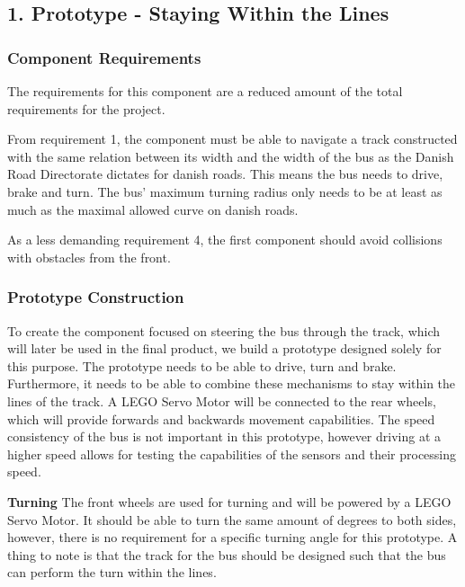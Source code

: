\subsection{1. Prototype - Staying Within the Lines}

\subsubsection{Component Requirements}
The requirements for this component are a reduced amount of the total requirements for the project.

From requirement 1, the component must be able to navigate a track constructed with the same relation between its width and the width of the bus as the Danish Road Directorate dictates for danish roads. This means the bus needs to drive, brake and turn. The bus' maximum turning radius only needs to be at least as much as the maximal allowed curve on danish roads. 

As a less demanding requirement 4, the first component should avoid collisions with obstacles from the front. 

\subsubsection{Prototype Construction}
To create the component focused on steering the bus through the track, which will later be used in the final product, we build a prototype designed solely for this purpose. The prototype needs to be able to drive, turn and brake. Furthermore, it needs to be able to combine these mechanisms to stay within the lines of the track. A LEGO Servo Motor will be connected to the rear wheels, which will provide forwards and backwards movement capabilities. The speed consistency of the bus is not important in this prototype, however driving at a higher speed allows for testing the capabilities of the sensors and their processing speed.

\textbf{Turning}\newline
The front wheels are used for turning and will be powered by a LEGO Servo Motor. It should be able to turn the same amount of degrees to both sides, however, there is no requirement for a specific turning angle for this prototype. A thing to note is that the track for the bus should be designed such that the bus can perform the turn within the lines.

